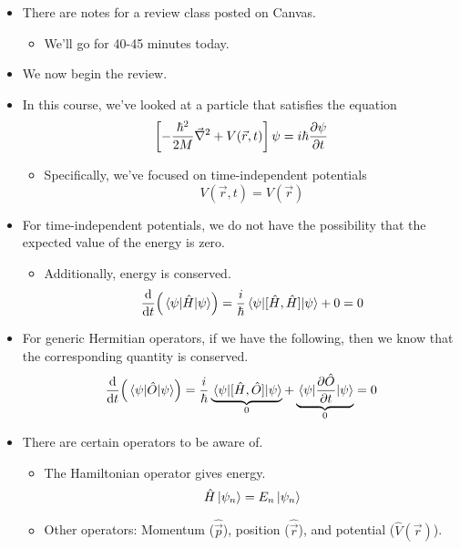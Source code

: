\documentclass[../notes.tex]{subfiles}
\begin{document}
\begin{itemize}
    \item There are notes for a review class posted on Canvas.
    \begin{itemize}
        \item We'll go for 40-45 minutes today.
    \end{itemize}
    \item We now begin the review.
    \item In this course, we've looked at a particle that satisfies the equation
    \begin{equation*}
        \left[ -\frac{\hbar^2}{2M}\vec{\nabla}^2+V(\vec{r},t) \right]\psi = i\hbar\pdv{\psi}{t}
    \end{equation*}
    \begin{itemize}
        \item Specifically, we've focused on time-independent potentials
        \begin{equation*}
            V(\vec{r},t) = V(\vec{r})
        \end{equation*}
    \end{itemize}
    \item For time-independent potentials, we do not have the possibility that the expected value of the energy is zero.
    \begin{itemize}
        \item Additionally, energy is conserved.
        \begin{equation*}
            \dv{t}(\ev{\hat{H}}{\psi}) = \frac{i}{\hbar}\ev{[\hat{H},\hat{H}]}{\psi}+0 = 0
        \end{equation*}
    \end{itemize}
    \item For generic Hermitian operators, if we have the following, then we know that the corresponding quantity is conserved.
    \begin{equation*}
        \dv{t}(\ev{\hat{O}}{\psi}) = \frac{i}{\hbar}\underbrace{\ev{[\hat{H},\hat{O}]}{\psi}}_0+\underbrace{\ev{\pdv{\hat{O}}{t}}{\psi}}_0
        = 0
    \end{equation*}
    \item There are certain operators to be aware of.
    \begin{itemize}
        \item The Hamiltonian operator gives energy.
        \begin{equation*}
            \hat{H}\ket{\psi_n} = E_n\ket{\psi_n}
        \end{equation*}
        \item Other operators: Momentum ($\hat{\vec{p}}$), position ($\hat{\vec{r}}$), and potential ($\hat{V}(\vec{r})$).

\end{itemize}
\end{itemize}
\end{document}
